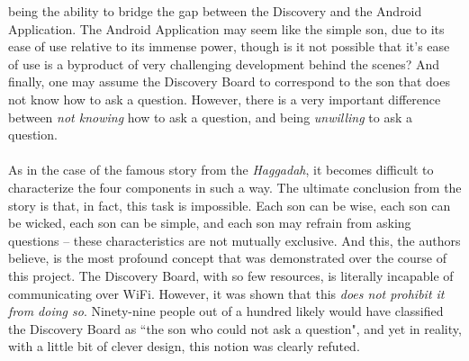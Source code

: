being the ability to bridge the gap between the Discovery and the Android Application. The Android
Application may seem like the simple son, due to its ease of use relative to its immense power,
though is it not possible that it's ease of use is a byproduct of very challenging development
behind the scenes? And finally, one may assume the Discovery Board to correspond to the son that
does not know how to ask a question. However, there is a very important difference between
\textit{not knowing} how to ask a question, and being \textit{unwilling} to ask a question.\\\\
As in the case of the famous story from the \textit{Haggadah}, it becomes difficult to characterize
the four components in such a way. The ultimate conclusion from the story is that, in fact, this
task is impossible. Each son can be wise, each son can be wicked, each son can be simple, and each
son may refrain from asking questions -- these characteristics are not mutually exclusive. And this,
the authors believe, is the most profound concept that was demonstrated over the course of this
project. The Discovery Board, with so few resources, is literally incapable of communicating over
WiFi. However, it was shown that this \textit{does not prohibit it from doing so}. Ninety-nine
people out of a hundred likely would have classified the Discovery Board as ``the son who could not
ask a question", and yet in reality, with a little bit of clever design, this notion was clearly
refuted.

